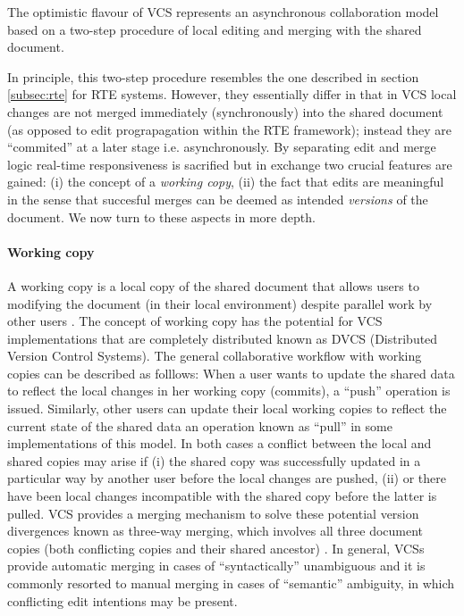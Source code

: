 \documentclass{sig-alternate}
\begin{document}
The optimistic flavour of VCS represents an asynchronous collaboration model based on a
two-step procedure of local editing and merging with the shared document.

In principle, this two-step procedure resembles the one described in section \ref{subsec:rte}
for RTE systems. However, they essentially differ in that in VCS local changes are not merged
immediately (synchronously) into the shared document (as opposed to edit prograpagation
within the RTE framework); instead they are ``commited'' at a later stage
\textemdash i.e. asynchronously.
By separating edit and merge logic real-time responsiveness is
sacrified but in exchange two crucial features are gained: (i) the concept of a
\textit{working copy}, (ii) the fact that edits are meaningful \textemdash in the sense
that succesful merges can be deemed as intended \textit{versions} of the document.
We now turn to these aspects in more depth.

\paragraph*{Working copy}
A working copy is a local copy of the shared document that allows users
to modifying the document (in their local environment) despite parallel work by other users
\cite{Collins-Sussman}. The concept of working copy has the potential for VCS implementations
that are completely distributed \textemdash known as DVCS (Distributed Version Control Systems). %
The general collaborative workflow with working copies can be described as folllows:
When a user wants to update the shared data to reflect the local changes in her working copy
(commits), a ``push'' operation is issued. Similarly, other users can update their local
working copies to reflect the current state of the shared data \textemdash an operation
known as ``pull'' in some implementations of this model.
In both cases a conflict between the local and shared copies may arise if (i) the shared
copy was successfully updated in a particular way by another user before the local changes
are pushed, (ii) or there have been local changes incompatible with the shared copy before
the latter is pulled.
VCS provides a merging mechanism to solve these potential version divergences known as
three-way merging, which involves all three document copies (both conflicting copies and their
shared ancestor) \cite{Altmanninger2009}. In general, VCSs provide automatic merging in cases
of ``syntactically'' unambiguous and it is commonly resorted to manual merging in cases
of ``semantic'' ambiguity, in which conflicting edit intentions may be present.%
\end{document}
